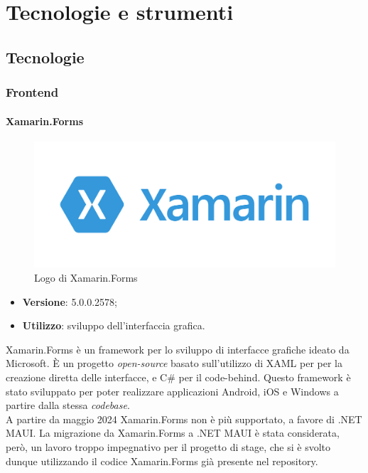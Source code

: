 \chapter{Tecnologie e strumenti}
\label{cap:tecnologie-strumenti}


\section{Tecnologie}

\subsection{Frontend}

\subsubsection{Xamarin.Forms}

\begin{figure}[H]
    \centering 
    \includegraphics[width=0.4\columnwidth]{images/loghi/xamarin-logo.png} 
    \caption{Logo di Xamarin.Forms}
\end{figure}

\begin{itemize}
    \item \textbf{Versione}: 5.0.0.2578;
    \item \textbf{Utilizzo}: sviluppo dell'interfaccia grafica.
\end{itemize}
Xamarin.Forms è un framework per lo sviluppo di interfacce grafiche ideato da Microsoft. È un progetto \emph{open-source} basato sull'utilizzo di XAML per per la creazione diretta delle interfacce, e C\# per il \gls{code-behind}. Questo framework è stato sviluppato per poter realizzare applicazioni Android, iOS e Windows a partire dalla stessa \emph{codebase}.\\
A partire da maggio 2024 Xamarin.Forms non è più supportato, a favore di .NET MAUI. La migrazione da Xamarin.Forms a .NET MAUI è stata considerata, però, un lavoro troppo impegnativo per il progetto di stage, che si è svolto dunque utilizzando il codice Xamarin.Forms già presente nel repository.

